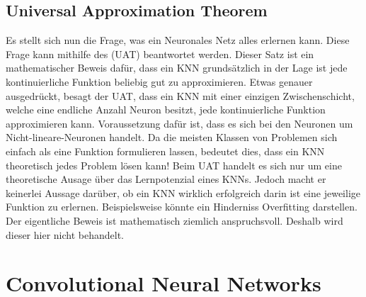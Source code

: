 \section{Universal Approximation Theorem}\label{sec:UAT}
Es stellt sich nun die Frage, was ein Neuronales Netz alles erlernen kann.
Diese Frage kann mithilfe des  (UAT)
beantwortet werden. Dieser Satz ist ein mathematischer Beweis dafür, dass ein KNN
grundsätzlich in der Lage ist jede kontinuierliche Funktion beliebig gut zu
approximieren.
\para{}
Etwas genauer ausgedrückt, besagt der UAT, dass ein KNN mit einer einzigen
Zwischenschicht, welche eine endliche Anzahl Neuron besitzt, jede kontinuierliche
Funktion approximieren kann. Voraussetzung dafür ist, dass es sich bei den
Neuronen um Nicht-lineare-Neuronen handelt.
Da die meisten Klassen von Problemen sich einfach als eine Funktion formulieren
lassen, bedeutet dies, dass ein KNN theoretisch jedes Problem lösen kann!
Beim UAT handelt es sich nur um eine theoretische
Ausage über das Lernpotenzial eines KNNs. Jedoch macht er keinerlei Aussage
darüber, ob ein KNN wirklich erfolgreich darin ist eine jeweilige Funktion zu erlernen.
Beispielsweise könnte ein Hinderniss Overfitting darstellen.
\para{}
Der eigentliche Beweis ist mathematisch ziemlich anspruchsvoll. Deshalb wird
dieser hier nicht behandelt.
\para{}
\cite{Nielsen}
\cite{wiki:uat}


\pagebreak
\chapter{Convolutional Neural Networks}\label{sec:CNN}

